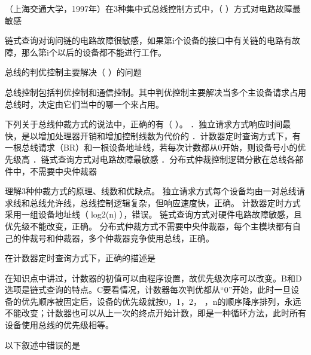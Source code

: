 \question （上海交通大学，1997年）在3种集中式总线控制方式中，（
）方式对电路故障最敏感
\par{}
\begin{solution}链式查询对询问链的电路故障很敏感，如果第i个设备的接口中有关链的电路有故障，那么第i个以后的设备都不能进行工作。
\end{solution}
\question 总线的判优控制主要解决（ ）的问题
\par{}
\begin{solution}总线控制包括判优控制和通信控制。其中判优控制主要解决当多个主设备请求占用总线时，决定由它们当中的哪一个来占用。
\end{solution}
\question 下列关于总线仲裁方式的说法中，正确的有（ ）。
．独立请求方式响应时间最快，是以增加处理器开销和增加控制线数为代价的
．计数器定时查询方式下，有一根总线请求（BR）和一根设备地址线，若每次计数都从0开始，则设备号小的优先级高
．链式查询方式对电路故障最敏感
．分布式仲裁控制逻辑分散在总线各部件中，不需要中央仲裁器
\par{}
\begin{solution}理解3种仲裁方式的原理、线数和优缺点。
独立请求方式每个设备均由一对总线请求线和总线允许线，总线控制逻辑复杂，但响应速度快，正确。
计数器定时方式采用一组设备地址线（log2(n)），错误。
链式查询方式对硬件电路故障敏感，且优先级不能改变，正确。
分布式仲裁方式不需要中央仲裁器，每个主模块都有自己的仲裁号和仲裁器，多个仲裁器竞争使用总线，正确。
\end{solution}
\question 在计数器定时查询方式下，正确的描述是
\par{}
\begin{solution}在知识点中讲过，计数器的初值可以由程序设置，故优先级次序可以改变。B和D选项是链式查询的特点。C要看情况，计数器每次判优都从``0''开始，此时一旦设备的优先顺序被固定后，设备的优先级就按0，1，2，
，n的顺序降序排列，永远不能改变；计数器也可以从上一次的终点开始计数，即是一种循环方法，此时所有设备使用总线的优先级相等。
\end{solution}
\question 以下叙述中错误的是
\par{}
